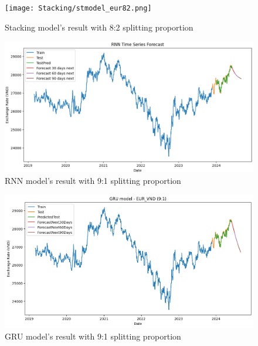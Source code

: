 \documentclass{ieeeojies}
\begin{document}
\begin{figure}[H]
  \centering
  \begin{minipage}{0.8\linewidth}
    \centering
    \texttt{[image: Stacking/stmodel\_eur82.png]}
    \caption{Stacking model's result with 8:2 splitting proportion}
    \label{fig13}
  \end{minipage}
\end{figure}
\begin{figure}[H]
  \centering
  \begin{minipage}{0.8\linewidth}
    \centering
    \includegraphics[width=\linewidth]{RNN/rnn_eur_91.png}
    \caption{RNN model's result with 9:1 splitting proportion}
    \label{fig14}
  \end{minipage}
\end{figure}
\begin{figure}[H]
  \centering
  \begin{minipage}{0.8\linewidth}
    \centering
    \includegraphics[width=\linewidth]{GRU/GRU_eur_91.png}
    \caption{GRU model's result with 9:1 splitting proportion}
    \label{fig15}
  \end{minipage}
\end{figure}
\end{document}
